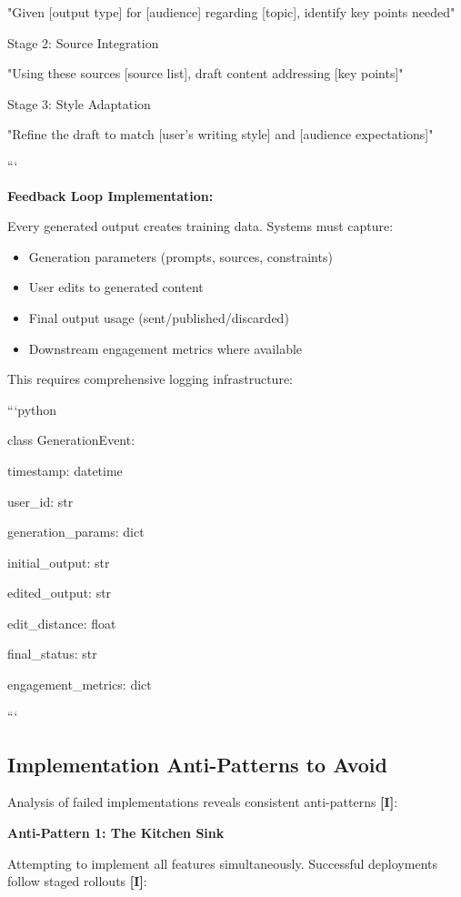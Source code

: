 \documentclass[a4paper,11pt]{article}
\newcommand{\ilabel}{\textbf{\textcolor{icolor}{[I]}}}
\begin{document}
"Given [output type] for [audience] regarding [topic], identify key points needed"


Stage 2: Source Integration

"Using these sources [source list], draft content addressing [key points]"


Stage 3: Style Adaptation

"Refine the draft to match [user's writing style] and [audience expectations]"

```


\textbf{Feedback Loop Implementation:}\par

Every generated output creates training data. Systems must capture:

\begin{itemize}
  \item Generation parameters (prompts, sources, constraints)
  \item User edits to generated content
  \item Final output usage (sent/published/discarded)
  \item Downstream engagement metrics where available
\end{itemize}

This requires comprehensive logging infrastructure:


```python

class GenerationEvent:

timestamp: datetime

user\_id: str

generation\_params: dict

initial\_output: str

edited\_output: str

edit\_distance: float

final\_status: str

engagement\_metrics: dict

```


\subsection{Implementation Anti-Patterns to Avoid}

Analysis of failed implementations reveals consistent anti-patterns \ilabel{}:


\textbf{Anti-Pattern 1: The Kitchen Sink}\par
Attempting to implement all features simultaneously. Successful deployments follow staged rollouts \ilabel{}:
\end{document}
